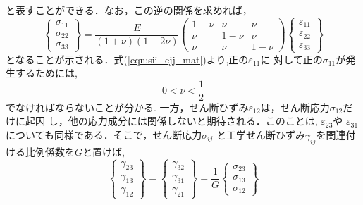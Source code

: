 \documentclass[10pt,a4j]{jbook}
\begin{document}
と表すことができる．なお，この逆の関係を求めれば，
\begin{equation}
	\left\{ 
	\begin{array}{*{20}{c}}
		\sigma _{11}\\
		\sigma _{22}\\
		\sigma _{33}
	\end{array} 
	\right\} 
	= 
	\frac{E}{\left( 1 + \nu  \right)\left( 1 - 2\nu  \right)}
	\left( 
		\begin{array}{*{20}{c}}
		1 - \nu & \nu &\nu \\
		\nu & 1 - \nu &\nu \\
		\nu &\nu &1 - \nu 
		\end{array}
	\right)
	\left\{ 
		\begin{array}{*{20}{c}}
		\varepsilon _{11}\\
		\varepsilon _{22}\\
		\varepsilon _{33}
		\end{array}
	\right\}
	\label{eqn:sii_ejj_mat}
\end{equation}
となることが示される．式(\ref{eqn:sii_ejj_mat})より,正の$\varepsilon_{11}$に
対して正の$\sigma_{11}$が発生するためには,
\begin{equation}
	0< \nu < \frac{1}{2} 
\end{equation}
でなければならないことが分かる.
一方，せん断ひずみ$\varepsilon_{12}$は，せん断応力$\sigma_{12}$だけに起因
し，他の応力成分には関係しないと期待される．このことは, $\varepsilon_{23}$や
$\varepsilon_{31}$についても同様である．そこで，せん断応力$\sigma_{ij}$
と工学せん断ひずみ$\gamma_{ij}$を関連付ける比例係数を$G$と置けば,
\begin{equation}
	\left\{ 
		\begin{array}{*{20}{c}}
		\gamma_{23}\\
		\gamma_{13}\\
		\gamma_{12}
		\end{array}
	\right\} 
	=
	\left\{ 
		\begin{array}{*{20}{c}}
		\gamma_{32}\\
		\gamma_{31}\\
		\gamma_{21}
		\end{array}
	\right\} 
	= \frac{1}{G}
	\left\{
		\begin{array}{*{20}{c}}
		\sigma _{23}\\
		\sigma _{13}\\
		\sigma _{12}
		\end{array}
	\right\}
	\label{eqn:gij_sij}
\end{equation}
\end{document}
